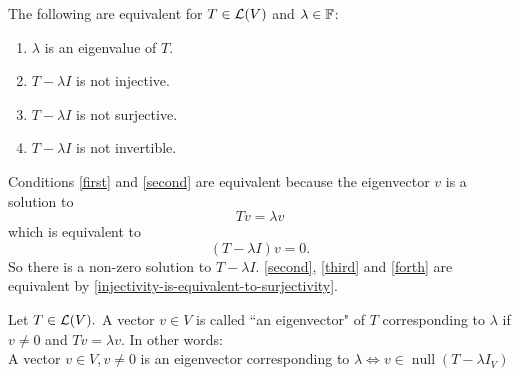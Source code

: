 \setcounter{thm}{6}
\begin{thm}
  \label{equivalent-conditions-to-be-an-eigenvalue}
  The following are equivalent for $T \in \mathcal{L}(V)$ and $\lambda \in \mathbb{F}$:
  \begin{enumerate}[label=(\alph*)]
    \item $\lambda$ is an eigenvalue of $T$. \label{first}
    \item $T-\lambda I$ is not injective. \label{second}
    \item $T-\lambda I$ is not surjective. \label{third}
    \item $T-\lambda I$ is not invertible. \label{forth}
  \end{enumerate}
\end{thm}
\begin{prf}
  Conditions \ref{first} and \ref{second} are equivalent because the eigenvector $v$ is a solution to 
  \begin{equation}
    Tv=\lambda v
  \end{equation} which is equivalent to 
  \begin{equation}
    (T-\lambda I)v=0.
  \end{equation} So there is a non-zero solution to $T-\lambda I$.
  \ref{second}, \ref{third} and \ref{forth} are equivalent by \ref{injectivity-is-equivalent-to-surjectivity}.
\end{prf}

\setcounter{thm}{7}
\begin{mydef}
  Let $T\in \mathcal{L}(V).$ A vector $v \in V$ is called ``an eigenvector" of $T$ corresponding to $\lambda$ if $v\neq 0$ and $Tv = \lambda v$.
  In other words:
  \\A vector $v\in V, v \neq 0$ is an eigenvector corresponding to $\lambda \iff v \in \operatorname{null}(T-\lambda I_V)$
\end{mydef}

